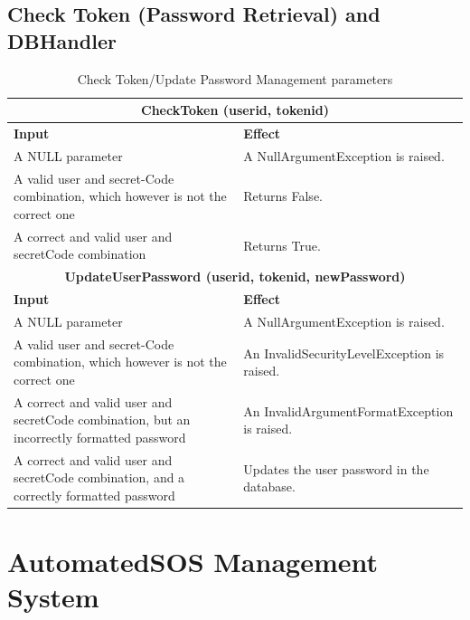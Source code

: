 \documentclass[a4paper, hidelinks, 12pt]{report}
\begin{document}
	\subsection{Check Token (Password Retrieval) and DBHandler}
	\begin{table}[H]
		\centering
		\begin{tabular}{|p{6cm}|p{9cm}|}
			\hline\hline
			\multicolumn{2}{c}{\textbf{CheckToken (userid, tokenid)} }\\
			\hline
			\textbf{Input} & \textbf{Effect} \\ [0.5ex]
			\hline
			A NULL parameter & A NullArgumentException is raised.  \\
			\hline
			A valid user and secret-Code combination, which however is not the correct one & Returns False.\\
			\hline
			A correct and valid user and secretCode combination & Returns True.\\

			\hline\hline
			\multicolumn{2}{c}{\textbf{UpdateUserPassword (userid, tokenid, newPassword)} }\\
			\hline
			\textbf{Input} & \textbf{Effect} \\ [0.5ex]
			\hline
			A NULL parameter & A NullArgumentException is raised.  \\
			\hline
			A valid user and secret-Code combination, which however is not the correct one & An InvalidSecurityLevelException is raised.\\
			\hline
			A correct and valid user
and secretCode combination, but an incorrectly formatted password & An InvalidArgumentFormatException is raised.\\
			\hline
			A correct and valid user and secretCode combination, and a correctly formatted password & Updates the user password in the database.\\
			\hline

		\end{tabular}
		\caption{Check Token/Update Password Management parameters}
		\label{fig:Check Token/Update Password Management parameters}
	\end{table}
	
	\section{AutomatedSOS Management System}
\end{document}
